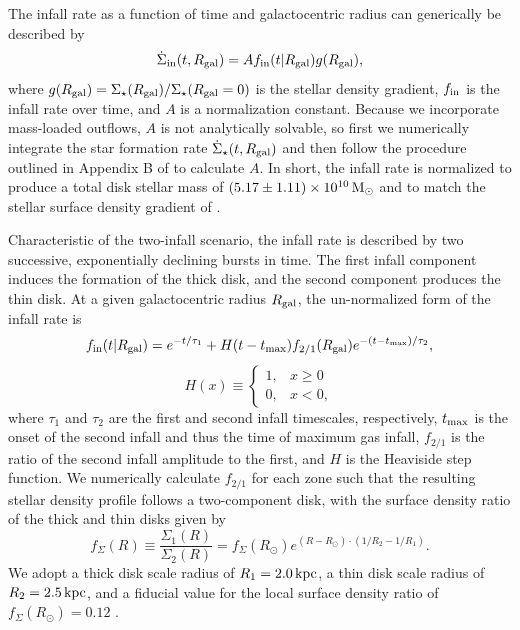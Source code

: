 \documentclass[twocolumn,twocolappendix,linenumbers]{aastex631}
\newcommand{\kpc}{\,{\rm kpc}}
\begin{document}
The infall rate as a function of time and galactocentric radius can generically be described by
\begin{equation}
    \label{eq:infall-rate}
    \dot\Sigma_{\rm in}(t,R_{\rm gal}) = A f_{\rm in}(t|R_{\rm gal}) g(R_{\rm gal}),
\end{equation}
where $g(R_{\rm gal})=\Sigma_\star(R_{\rm gal}) / \Sigma_\star(R_{\rm gal}=0)$ is the stellar density gradient, $f_{\rm in}$ is the infall rate over time, and $A$ is a normalization constant. Because we incorporate mass-loaded outflows, $A$ is not analytically solvable, so first we numerically integrate the star formation rate $\dot\Sigma_\star(t,R_{\rm gal})$ and then follow the procedure outlined in Appendix B of \citet{johnson_stellar_2021} to calculate $A$. In short, the infall rate is normalized to produce a total disk stellar mass of $(5.17\pm1.11)\times 10^{10}\,{\rm M}_\odot$ \citep{licquia_improved_2015} and to match the stellar surface density gradient of \citet{bland-hawthorn_galaxy_2016}.

Characteristic of the two-infall scenario, the infall rate is described by two successive, exponentially declining bursts in time. The first infall component induces the formation of the thick disk, and the second component produces the thin disk. At a given galactocentric radius $R_{\rm gal}$, the un-normalized form of the infall rate is
\begin{equation}
    \label{eq:twoinfall-ifr}
    f_{\rm in}(t|R_{\rm gal}) = e^{-t/\tau_1} + H(t-t_{\rm max}) f_{2/1} (R_{\rm gal}) e^{-(t-t_{\rm max})/\tau_2},
\end{equation}
\begin{equation*}
    H(x) \equiv 
    \begin{cases}
        1, & x \ge 0 \\
        0, & x < 0,
    \end{cases}
\end{equation*}
where $\tau_1$ and $\tau_2$ are the first and second infall timescales, respectively, $t_{\rm max}$ is the onset of the second infall and thus the time of maximum gas infall,  $f_{2/1}$ is the ratio of the second infall amplitude to the first, and $H$ is the Heaviside step function. We numerically calculate $f_{2/1}$ for each zone such that the resulting stellar density profile follows a two-component disk, with the surface density ratio of the thick and thin disks given by
\begin{equation}
    f_\Sigma(R) \equiv \frac{\Sigma_1(R)}{\Sigma_2(R)} = f_\Sigma(R_\odot) e^{(R-R_\odot)\cdot(1/R_2 - 1/R_1)}.
\end{equation}
We adopt a thick disk scale radius of $R_1=2.0\kpc$, a thin disk scale radius of $R_2=2.5\kpc$, and a fiducial value for the local surface density ratio of $f_\Sigma(R_\odot)=0.12$ \citep{bland-hawthorn_galaxy_2016}. 
\end{document}
